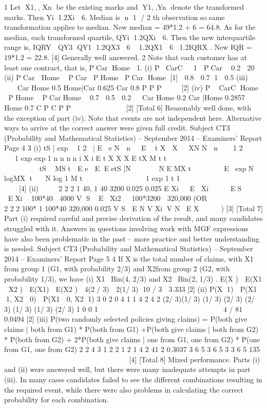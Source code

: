 1 Let X1,, Xn be the existing marks and Y1,,Yn denote the transformed marks.
Then Yi 1.2Xi  6.
Median is n 1 / 2 th observation so same transformation applies to median.
New median = 49*1.2 + 6 = 64.8.
As for the median, each transformed quartile, QYi 1.2QXi  6. Then the new
interquartile range is, IQRY  QY3 QY1 1.2QX3  6  1.2QX1  6 1.2IQRX .
New IQR = 19*1.2 = 22.8. [4]
Generally well answered.
2 Note that each customer has at least one contract, that is, PCar Home 1.
(i) P CarC  1  PCar  0.2  20%
(ii) PCar  Home  PCar PHome PCar Home [1]
 0.8  0.7 1  0.5
(iii)    
 
Car Home 0.5 Home|Car 0.625
Car 0.8
P
P
P
    [2]
(iv) P  CarC Home  PHome  PCarHome  0.7  0.5  0.2
 
Car Home 0.2 Car |Home 0.2857
Home 0.7
C
P C
P
P
            [2]
[Total 6]
Reasonably well done, with the exception of part (iv). Note that events are not independent
here. Alternative ways to arrive at the correct answer were given full credit.
Subject CT3 (Probability and Mathematical Statistics) – September 2014 – Examiners’ Report
Page 4
3 (i) tS | exp  1 2 |
  E e N  n  E  t X  X  XN N  n
  1 2      
1
exp exp 1
n n n
n i X
i
E t X X X E tX M t t


                      
   tS 
MS t  E e
 E EetS |N
 
  N
E MX t   
 
 E expN logMX t 
N log 1
M t
           
1
exp 1 t 1               
[4]
(ii)  
 
2 2
2
1 40, 1 40 3200
0.025 0.025
E Xi   E Xi    
ES EXi  100*40  4000
V S E Xi2  100*3200  320,000
(OR
           
   
  2 2
  2
  100* 1 100*40 320,000
  0.025
  V S  E N V Xi V N E X     )
[3]
[Total 7]
Part (i) required careful and precise derivation of the result, and many candidates struggled
with it. Answers in questions involving work with MGF expressions have also been
problematic in the past – more practice and better understanding is needed.
Subject CT3 (Probability and Mathematical Statistics) – September 2014 – Examiners’ Report
Page 5
4 If X is the total number of claims, with X1 from group 1 (G1, with probability 2/3) and
X2from group 2 (G2, with probability 1/3), we have
(i) X1~ Bin(4, 2/3) and X2~ Bin(2, 1/3) .
E(X )  E(X1  X2 )  E(X1)  E(X2 )
 4(2 / 3)  2(1/ 3) 10 / 3  3.333 [2]
(ii) P(X 1)  P(X1 1, X2  0)  P(X1  0, X2 1)
3 0 2 0 4 1 1 4 2 4 2
(2/ 3)(1/ 3) (1/ 3) (2/ 3) (2/ 3) (1/ 3) (1/ 3) (2/ 3)
1 0 0 1
       
         
       
 4 / 81  0.0494 [2]
(iii) P(two randomly selected policies giving claims) =
  P(both give claims | both from G1) * P(both from G1)
+P(both give claims | both from G2) * P(both from G2)
+ 2*P(both give claims | one from G1, one from G2) * P(one from G1, one
                                                       from G2)
2 2 4 3 1 2 2 1 2 1 4 2 41 2 0.3037
3 6 5 3 6 5 3 3 6 5 135
                   
      
[4]
[Total 8]
Mixed performance. Parts (i) and (ii) were answered well, but there were many inadequate
attempts in part (iii). In many cases candidates failed to see the different combinations
resulting in the required event, while there were also problems in calculating the correct
probability for each combination.

